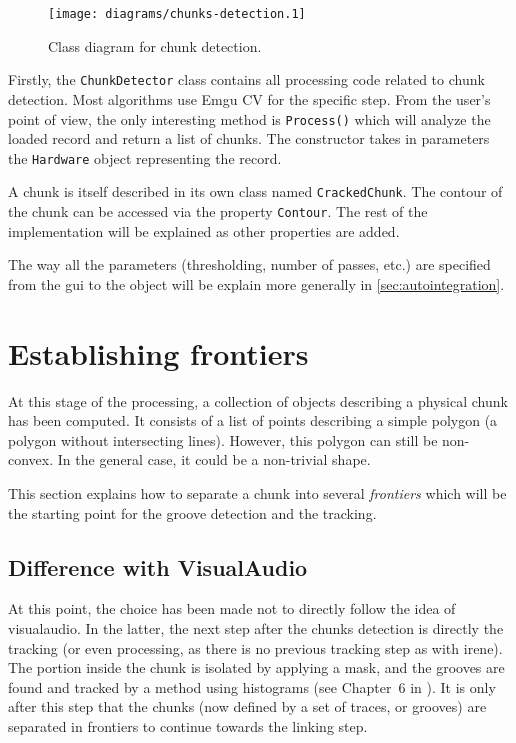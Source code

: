\begin{figure}[!ht]
\centering
\texttt{[image: diagrams/chunks-detection.1]}
\caption{Class diagram for chunk detection.}
\label{fig:chunksdetectdiag}
\end{figure}

Firstly, the \texttt{ChunkDetector} class contains all processing code related to chunk detection. Most algorithms use Emgu CV for the specific step. From the user's point of view, the only interesting method is \texttt{Process()} which will analyze the loaded record and return a list of chunks. The constructor takes in parameters the \texttt{Hardware} object representing the record.

A chunk is itself described in its own class named \texttt{CrackedChunk}. The contour of the chunk can be accessed via the property \texttt{Contour}. The rest of the implementation will be explained as other properties are added.

The way all the parameters (thresholding, number of passes, etc.) are specified from the \gls{gui} to the object will be explain more generally in \autoref{sec:autointegration}.

\section{Establishing frontiers}
\label{sec:findfrontiers}

At this stage of the processing, a collection of objects describing a physical chunk has been computed. It consists of a list of points describing a simple polygon (a polygon without intersecting lines). However, this polygon can still be non-convex. In the general case, it could be a non-trivial shape.

This section explains how to separate a chunk into several \emph{frontiers} which will be the starting point for the groove detection and the tracking.

\subsection{Difference with VisualAudio}

At this point, the choice has been made not to directly follow the idea of \gls{visualaudio}. In the latter, the next step after the chunks detection is directly the tracking (or even processing, as there is no previous tracking step as with \gls{irene}). The portion inside the chunk is isolated by applying a mask, and the grooves are found and tracked by a method using histograms (see Chapter~6 in \cite{seydoux08}). It is only after this step that the chunks (now defined by a set of traces, or grooves) are separated in frontiers to continue towards the linking step.

